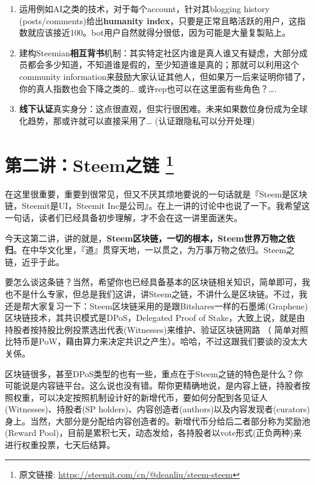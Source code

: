 \documentclass[]{ctexbook}
\begin{document}
\begin{enumerate}
\def\labelenumi{\arabic{enumi})}
\item
  运用例如AI之类的技术，对于每个account，针对其blogging history (posts/comments)给出\textbf{humanity index}，只要是正常且略活跃的用户，这指数就应该接近100。bot用户自然就得分很低，因为可能是大量复製贴上。
\item
  建构Steemian\textbf{相互背书}机制：其实特定社区内谁是真人谁又有疑虑，大部分成员都会多少知道，不知道谁是假的，至少知道谁是真的；那就可以利用这个community information来鼓励大家认证其他人，但如果万一后来证明你错了，你的真人指数也会下降之类的\ldots{} 或许rep也可以在这里面有些角色？\ldots{}.
\item
  \textbf{线下认证}真实身分：这点很直观，但实行很困难。未来如果数位身份成为全球化趋势，那或许就可以直接采用了\ldots{} (认证跟隐私可以分开处理)
\end{enumerate}

\hypertarget{liu2}{%
\section[第二讲：Steem之链 ]{\texorpdfstring{第二讲：Steem之链 \footnote{原文链接: \url{https://steemit.com/cn/@deanliu/steem-steem}}}{第二讲：Steem之链 }}\label{liu2}}

在这里很重要，重要到很常见，但又不厌其烦地要说的一句话就是『Steem是区块链，Steemit是UI，Steemit Inc是公司』。在上一讲的讨论中也说了一下。我希望这一句话，读者们已经具备初步理解，才不会在这一讲里面迷失。

今天这第二讲，讲的就是，\textbf{Steem区块链，一切的根本，Steem世界万物之依归}。在中华文化里，『道』贯穿天地，一以贯之，为万事万物之依归。Steem之链，近乎于此。

要怎么谈这条链？当然，希望你也已经具备基本的区块链相关知识，简单即可，我也不是什么专家，但总是我们这讲，讲Steem之链，不讲什么是区块链。不过，我还是帮大家复习一下：Steem区块链采用的是跟Bitshares一样的石墨烯(Graphene)区块链技术，其共识模式是DPoS，Delegated Proof of Stake，大致上说，就是由持股者按持股比例投票选出代表(Witnesses)来维护、验证区块链网路 （ 简单对照比特币是PoW，藉由算力来决定共识之产生）。哈哈，不过这跟我们要谈的没太大关係。

区块链很多，甚至DPoS类型的也有一些，重点在于Steem之链的特色是什么？你可能说是内容链平台。这么说也没有错。帮你更精确地说，是内容上链，持股者按照权重，可以决定按照机制设计好的新增代币，要如何分配到各见证人(Witnesses)、持股者(SP holders)、内容创造者(authors)以及内容发现者(curators)身上。当然，大部分是分配给内容创造者的。新增代币分给后二者部分称为奖励池(Reward Pool)，目前是累积七天，动态发给，各持股者以vote形式(正负两种)来进行权重投票，七天后结算。
\end{document}
